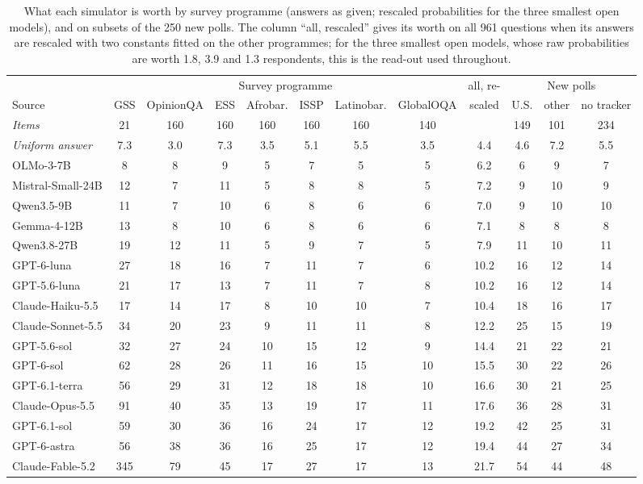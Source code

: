 \begin{table}[h]
\centering\small
\setlength{\tabcolsep}{3.6pt}
\begin{tabular}{lccccccccccc}
\toprule
 & \multicolumn{7}{c}{Survey programme} & all, re- & \multicolumn{3}{c}{New polls} \\
\cmidrule(lr){2-8}\cmidrule(lr){10-12}
Source & GSS & OpinionQA & ESS & Afrobar. & ISSP & Latinobar. & GlobalOQA & scaled & U.S. & other & no tracker \\
\midrule
\emph{Items} & 21 & 160 & 160 & 160 & 160 & 160 & 140 & & 149 & 101 & 234 \\
\emph{Uniform answer} & 7.3 & 3.0 & 7.3 & 3.5 & 5.1 & 5.5 & 3.5 & 4.4 & 4.6 & 7.2 & 5.5 \\
\midrule
OLMo-3-7B & 8 & 8 & 9 & 5 & 7 & 5 & 5 & 6.2 & 6 & 9 & 7 \\
Mistral-Small-24B & 12 & 7 & 11 & 5 & 8 & 8 & 5 & 7.2 & 9 & 10 & 9 \\
Qwen3.5-9B & 11 & 7 & 10 & 6 & 8 & 6 & 6 & 7.0 & 9 & 10 & 10 \\
Gemma-4-12B & 13 & 8 & 10 & 6 & 8 & 6 & 6 & 7.1 & 8 & 8 & 8 \\
Qwen3.8-27B & 19 & 12 & 11 & 5 & 9 & 7 & 5 & 7.9 & 11 & 10 & 11 \\
GPT-6-luna & 27 & 18 & 16 & 7 & 11 & 7 & 6 & 10.2 & 16 & 12 & 14 \\
GPT-5.6-luna & 21 & 17 & 13 & 7 & 11 & 7 & 8 & 10.2 & 16 & 12 & 14 \\
Claude-Haiku-5.5 & 17 & 14 & 17 & 8 & 10 & 10 & 7 & 10.4 & 18 & 16 & 17 \\
Claude-Sonnet-5.5 & 34 & 20 & 23 & 9 & 11 & 11 & 8 & 12.2 & 25 & 15 & 19 \\
GPT-5.6-sol & 32 & 27 & 24 & 10 & 15 & 12 & 9 & 14.4 & 21 & 22 & 21 \\
GPT-6-sol & 62 & 28 & 26 & 11 & 16 & 15 & 10 & 15.5 & 30 & 22 & 26 \\
GPT-6.1-terra & 56 & 29 & 31 & 12 & 18 & 18 & 10 & 16.6 & 30 & 21 & 25 \\
Claude-Opus-5.5 & 91 & 40 & 35 & 13 & 19 & 17 & 11 & 17.6 & 36 & 28 & 31 \\
GPT-6.1-sol & 59 & 30 & 36 & 16 & 24 & 17 & 12 & 19.2 & 42 & 25 & 31 \\
GPT-6-astra & 56 & 38 & 36 & 16 & 25 & 17 & 12 & 19.4 & 44 & 27 & 34 \\
Claude-Fable-5.2 & 345 & 79 & 45 & 17 & 27 & 17 & 13 & 21.7 & 54 & 44 & 48 \\
\bottomrule
\end{tabular}
\caption{What each simulator is worth by survey programme (answers as given; rescaled probabilities for the three smallest open models), and on subsets of the 250 new polls. The column ``all, rescaled'' gives its worth on all 961 questions when its answers are rescaled with two constants fitted on the other programmes; for the three smallest open models, whose raw probabilities are worth 1.8, 3.9 and 1.3 respondents, this is the read-out used throughout.}
\label{tab:prog}
\end{table}
